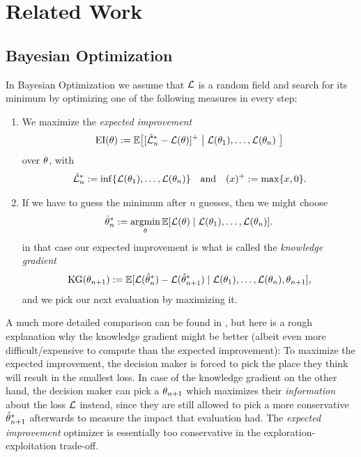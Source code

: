 \section{Related Work}

\subsection{Bayesian Optimization}

In Bayesian Optimization \parencite[e.g.][]{frazierBayesianOptimization2018}
we assume that \(\mathcal{L}\) is a random field and search for its minimum by
optimizing one of the following measures in every step:

\begin{enumerate}
	\item We maximize the \emph{expected improvement} 
	\begin{align}\label{eq: expected improvement}
		\operatorname{EI}(\theta) := \mathbb{E}\big[
			[\hat{\mathcal{L}}_n^*- \mathcal{L}(\theta)]^+
			\bigm|
			\mathcal{L}(\theta_1),\dots, \mathcal{L}(\theta_n)\
		\big]
	\end{align}
	over \(\theta\), with
	\begin{align*}
		\hat{\mathcal{L}}_n^* := \inf\{\mathcal{L}(\theta_1),\dots, \mathcal{L}(\theta_n)\}
		\quad \text{and} \quad
		(x)^+ := \max\{x, 0\}.
	\end{align*}

	\item If we have to guess the minimum after \(n\) guesses, then we might
	choose
	\begin{align*}
		\hat{\theta}^*_n
		:= \operatorname*{argmin}_{\theta} \mathbb{E}[\mathcal{L}(\theta)\mid \mathcal{L}(\theta_1), \dots, \mathcal{L}(\theta_n)].
	\end{align*}
	in that case our expected improvement is what is called the \emph{knowledge gradient}
	\begin{align*}
		\operatorname{KG}(\theta_{n+1}) := \mathbb{E}[
			\mathcal{L}(\hat{\theta}^*_n) - \mathcal{L}(\hat{\theta}^*_{n+1})
			\mid \mathcal{L}(\theta_1), \dots, \mathcal{L}(\theta_n), \theta_{n+1}
		],
	\end{align*}
	and we pick our next evaluation by maximizing it.	
\end{enumerate}
A much more detailed comparison can be found in \cite{frazierBayesianOptimization2018},
but here is a rough explanation why the knowledge gradient might be better
(albeit even more difficult/expensive to compute than the expected improvement):
To maximize the expected improvement, the decision maker is forced to pick the
place they think will result in the smallest loss. In case of the knowledge
gradient on the other hand, the decision maker can pick a \(\theta_{n+1}\) which
maximizes their \emph{information} about the loss \(\mathcal{L}\) instead, since they
are still allowed to pick a more conservative \(\hat{\theta}^*_{n+1}\)
afterwards to measure the impact that evaluation had. The \emph{expected improvement}
optimizer is essentially too conservative in the exploration-exploitation trade-off. 

